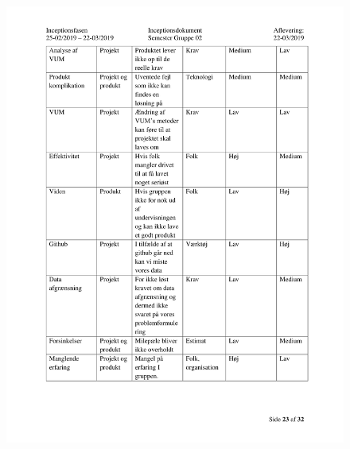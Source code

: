 \begin{figure}[hb]
  \includegraphics[scale = 0.33]{./PNG/Inceptions/Gruppe02+InceptionsDokument-24.jpg} 
\end{figure}

